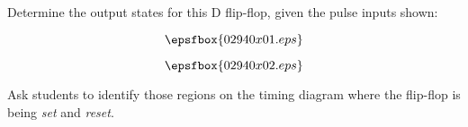 

Determine the output states for this D flip-flop, given the pulse inputs shown:

$$\epsfbox{02940x01.eps}$$







$$\epsfbox{02940x02.eps}$$







Ask students to identify those regions on the timing diagram where the flip-flop is being {\it set} and {\it reset}.





